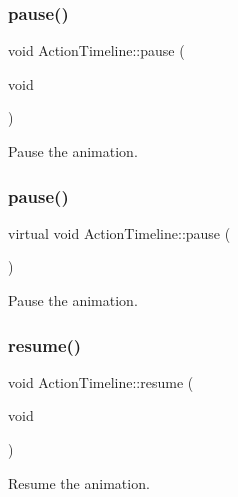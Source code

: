 \subsubsection{\texorpdfstring{pause()}{pause()}\hspace{0.1cm}{\footnotesize\ttfamily [1/2]}}
{\footnotesize\ttfamily void Action\+Timeline\+::pause (\begin{DoxyParamCaption}\item[{void}]{ }\end{DoxyParamCaption})\hspace{0.3cm}{\ttfamily [virtual]}}

Pause the animation. \mbox{\label{classActionTimeline_aff80867e59c9974e2644e4e868a71e39}} 
\subsubsection{\texorpdfstring{pause()}{pause()}\hspace{0.1cm}{\footnotesize\ttfamily [2/2]}}
{\footnotesize\ttfamily virtual void Action\+Timeline\+::pause (\begin{DoxyParamCaption}{ }\end{DoxyParamCaption})\hspace{0.3cm}{\ttfamily [virtual]}}

Pause the animation. \mbox{\label{classActionTimeline_aa18d7c57e37b11e378c0718ea78e3f55}} 
\subsubsection{\texorpdfstring{resume()}{resume()}\hspace{0.1cm}{\footnotesize\ttfamily [1/2]}}
{\footnotesize\ttfamily void Action\+Timeline\+::resume (\begin{DoxyParamCaption}\item[{void}]{ }\end{DoxyParamCaption})\hspace{0.3cm}{\ttfamily [virtual]}}

Resume the animation. \mbox{\label{classActionTimeline_a24c8bfe9480ca2b99ee6cd44e4ab8307}} 

